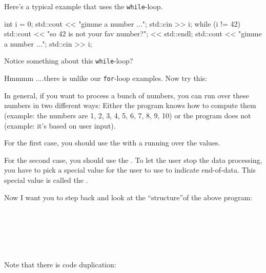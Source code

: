 \newpage{}

Here's a typical example that uses the \texttt{while}-loop.
\begin{console}
int i = 0;
std::cout << "gimme a number ...";
std::cin >> i;
while (i != 42)
{     
      std::cout << "so 42 is not your fav number?";
                << std::endl;
      std::cout << "gimme a number ...";
      std::cin >> i;
}
\end{console}

Notice something about this \texttt{while}-loop?

Hmmmm ....there is  unlike our \texttt{for}-loop examples. Now try this:

In general, if you want to process a bunch of numbers, you can run over
these numbers in two different ways: Either the program knows how to
compute them (example: the numbers are 1, 2, 3, 4, 5, 6, 7, 8, 9, 10) or
the program does not (example: it's based on user
input).

For the first case, you should use the  with a
 running over the values.

For the second case, you should use the . To let the
user stop the data processing, you have to pick a special value for the
user to use to indicate end-of-data. This special value is called the
.

Now I want you to step back and look at the ``structure''of the above
program:

\\
\\
\\
\\
\\

Note that there is code duplication:

\\
\\
\\
\\
\\


